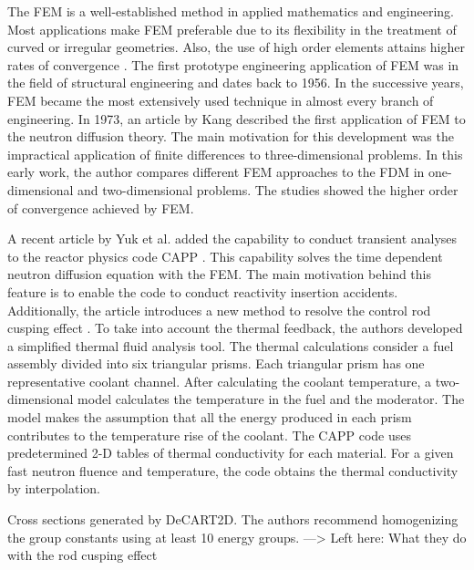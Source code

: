 \documentclass[11pt,letterpaper]{article}
\begin{document}
The \gls{FEM} is a well-established method in applied mathematics and engineering.
Most applications make \gls{FEM} preferable due to its flexibility in the treatment of curved or irregular geometries.
Also, the use of high order elements attains higher rates of convergence \cite{cavdar_finite_2004}.
The first prototype engineering application of \gls{FEM} was in the field of structural engineering and dates back to 1956.
In the successive years, \gls{FEM} became the most extensively used technique in almost every branch of engineering.
In 1973, an article by Kang \cite{kang_finite_1973} described the first application of \gls{FEM} to the neutron diffusion theory.
The main motivation for this development was the impractical application of finite differences to three-dimensional problems.
In this early work, the author compares different \gls{FEM} approaches to the \gls{FDM} in one-dimensional and two-dimensional problems.
The studies showed the higher order of convergence achieved by \gls{FEM}.





A recent article by Yuk et al. \cite{yuk_time-dependent_2020} added the capability to conduct transient analyses to the reactor physics code CAPP \cite{lee_development_2011}.
This capability solves the time dependent neutron diffusion equation with the \gls{FEM}.
The main motivation behind this feature is to enable the code to conduct reactivity insertion accidents.
Additionally, the article introduces a new method to resolve the control rod cusping effect \cite{joo_resolution_1984}.
To take into account the thermal feedback, the authors developed a simplified thermal fluid analysis tool.
The thermal calculations consider a fuel assembly divided into six triangular prisms.
Each triangular prism has one representative coolant channel.
After calculating the coolant temperature, a two-dimensional model calculates the temperature in the fuel and the moderator.
The model makes the assumption that all the energy produced in each prism contributes to the temperature rise of the coolant.
The CAPP code uses predetermined 2-D tables of thermal conductivity for each material.
For a given fast neutron fluence and temperature, the code obtains the thermal conductivity by interpolation.

Cross sections generated by DeCART2D.
The authors recommend homogenizing the group constants using at least 10 energy groups.
---> Left here: What they do with the rod cusping effect
\end{document}
